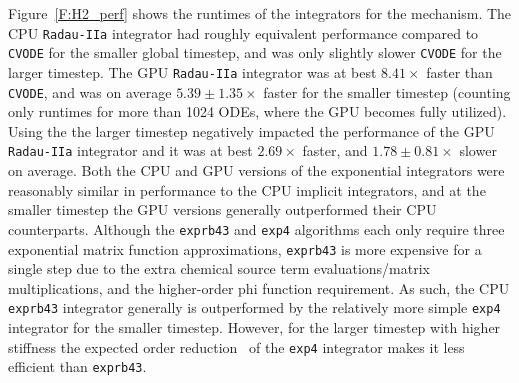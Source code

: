 \documentclass[preprint]{elsarticle}
\begin{document}
Figure~\ref{F:H2_perf} shows the runtimes of the integrators for the  mechanism.
The CPU \texttt{Radau-IIa} integrator had roughly equivalent performance compared to \texttt{CVODE} for the smaller global timestep, and was only slightly slower \texttt{CVODE} for the larger timestep.
The GPU \texttt{Radau-IIa} integrator was at best $8.41\times$ faster than \texttt{CVODE}, and was on average $5.39\pm1.35\times$ faster for the smaller timestep (counting only runtimes for more than 1024 ODEs, where the GPU becomes fully utilized).
Using the the larger timestep negatively impacted the performance of the GPU \texttt{Radau-IIa} integrator and it was at best $2.69\times$ faster, and $1.78\pm0.81\times$ slower on average.
Both the CPU and GPU versions of the exponential integrators were reasonably similar in performance to the CPU implicit integrators, and at the smaller timestep the GPU versions generally outperformed their CPU counterparts.
Although the \texttt{exprb43} and \texttt{exp4} algorithms each only require three exponential matrix function approximations, \texttt{exprb43} is more expensive for a single step due to the extra chemical source term evaluations\slash matrix multiplications, and the higher-order phi function requirement.
As such, the CPU \texttt{exprb43} integrator generally is outperformed by the relatively more simple \texttt{exp4} integrator for the smaller timestep.
However, for the larger timestep with higher stiffness the expected order reduction~\cite{Bisetti:2012jw} of the \texttt{exp4} integrator makes it less efficient than \texttt{exprb43}.
\end{document}
